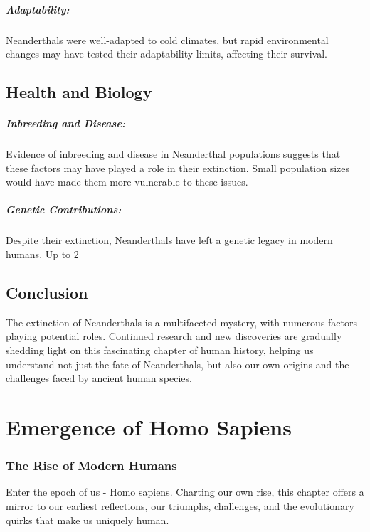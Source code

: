 \documentclass[a4paper,12pt]{book}
\begin{document}
\paragraph{Adaptability:}
Neanderthals were well-adapted to cold climates, but rapid environmental changes may have tested their adaptability limits, affecting their survival.

\section*{Health and Biology}

\paragraph{Inbreeding and Disease:}
Evidence of inbreeding and disease in Neanderthal populations suggests that these factors may have played a role in their extinction. Small population sizes would have made them more vulnerable to these issues.

\paragraph{Genetic Contributions:}
Despite their extinction, Neanderthals have left a genetic legacy in modern humans. Up to 2%

\section*{Conclusion}

The extinction of Neanderthals is a multifaceted mystery, with numerous factors playing potential roles. Continued research and new discoveries are gradually shedding light on this fascinating chapter of human history, helping us understand not just the fate of Neanderthals, but also our own origins and the challenges faced by ancient human species.

\chapter{Emergence of Homo Sapiens}
\subsection*{The Rise of Modern Humans}
Enter the epoch of us - Homo sapiens. Charting our own rise, this chapter offers a mirror to our earliest reflections, our triumphs, challenges, and the evolutionary quirks that make us uniquely human.
\end{document}
